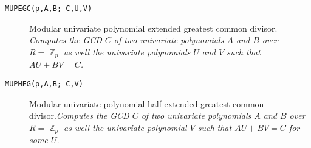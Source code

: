 \begin{description}
\begin{description}
    \item[{\tt  MUPEGC(p,A,B; C,U,V) 
}] Modular univariate polynomial extended greatest
                  common divisor. {\em Computes the GCD $C$ of two
univariate polynomials $A$ and $B$ over $R = \BbbZ_p$ as well the
univariate polynomials $U$ and $V$ such that $AU+BV=C$.}

    \item[{\tt  MUPHEG(p,A,B; C,V) 
}] Modular univariate polynomial half-extended greatest
                  common divisor.{\em Computes the GCD $C$ of two
univariate polynomials $A$ and $B$ over $R = \BbbZ_p$ as well the
univariate polynomial $V$ such that $AU+BV=C$ for some $U$.}

  \end{description}

\end{description}  %
